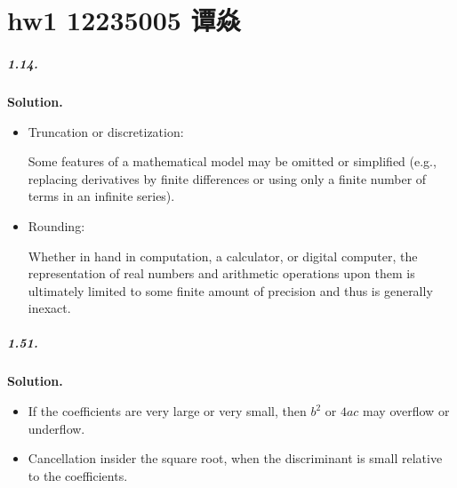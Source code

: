 \documentclass[a4paper]{book}
\newenvironment{solution}%
{\noindent\textbf{Solution.}}%
{\qedhere}
\numberwithin{equation}{chapter}
\theoremstyle{definition}
\begin{document}
\pagestyle{plain}



\chapter{hw1 12235005 谭焱}

\paragraph*{1.14.}
\begin{solution}
    \begin{itemize}
        \item Truncation or discretization:

              Some features of a mathematical model may be omitted or simplified
              (e.g., replacing  derivatives by finite differences or using only
              a finite number of terms in an infinite series).

        \item Rounding:

              Whether in hand in computation, a calculator, or digital computer,
              the representation of real numbers and arithmetic operations upon
              them is ultimately limited to some finite amount of precision
              and thus is generally inexact.

    \end{itemize}
\end{solution}

\paragraph*{1.51.}
\begin{solution}
    \begin{itemize}
        \item If the coefficients are very large or very small,
              then $b^2$ or $4ac$ may overflow or underflow.

        \item Cancellation insider the square root, when the
              discriminant is small relative to the coefficients.
    \end{itemize}
\end{solution}
\end{document}
